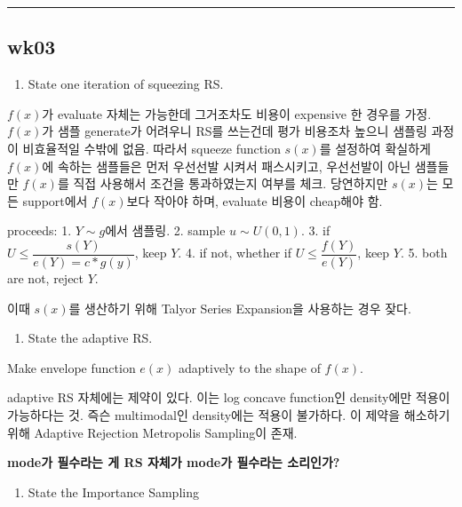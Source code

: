 \documentclass[
]{book}
\providecommand{\tightlist}{%
  \setlength{\itemsep}{0pt}\setlength{\parskip}{0pt}}
\begin{document}
\begin{center}\rule{0.5\linewidth}{0.5pt}\end{center}

\hypertarget{wk03}{%
\subsection{wk03}\label{wk03}}

\begin{enumerate}
\def\labelenumi{\arabic{enumi}.}
\tightlist
\item
  State one iteration of squeezing RS.
\end{enumerate}

\(f(x)\)가 evaluate 자체는 가능한데 그거조차도 비용이 expensive 한 경우를 가정. \(f(x)\)가 샘플 generate가 어려우니 RS를 쓰는건데 평가 비용조차 높으니 샘플링 과정이 비효율적일 수밖에 없음. 따라서 squeeze function \(s(x)\)를 설정하여 확실하게 \(f(x)\)에 속하는 샘플들은 먼저 우선선발 시켜서 패스시키고, 우선선발이 아닌 샘플들만 \(f(x)\)를 직접 사용해서 조건을 통과하였는지 여부를 체크. 당연하지만 \(s(x)\)는 모든 support에서 \(f(x)\)보다 작아야 하며, evaluate 비용이 cheap해야 함.

proceeds:
1. \(Y \sim g\)에서 샘플링.
2. sample \(u \sim U(0,1)\).
3. if \(U \le \dfrac {s(Y)}{e(Y) = c \ast g(y)}\), keep \(Y\).
4. if not, whether if \(U \le \dfrac {f(Y)}{e(Y)}\), keep \(Y\).
5. both are not, reject \(Y\).

이때 \(s(x)\)를 생산하기 위해 Talyor Series Expansion을 사용하는 경우 잦다.

\begin{enumerate}
\def\labelenumi{\arabic{enumi}.}
\setcounter{enumi}{1}
\tightlist
\item
  State the adaptive RS.
\end{enumerate}

Make envelope function \(e(x)\) adaptively to the shape of \(f(x)\).

adaptive RS 자체에는 제약이 있다. 이는 log concave function인 density에만 적용이 가능하다는 것. 즉슨 multimodal인 density에는 적용이 불가하다. 이 제약을 해소하기 위해 Adaptive Rejection Metropolis Sampling이 존재.

\textbf{mode가 필수라는 게 RS 자체가 mode가 필수라는 소리인가?}

\begin{enumerate}
\def\labelenumi{\arabic{enumi}.}
\setcounter{enumi}{2}
\tightlist
\item
  State the Importance Sampling
\end{enumerate}
\end{document}
